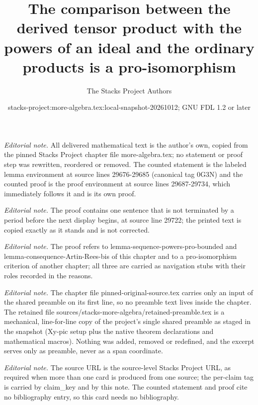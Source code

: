 \documentclass[10pt,a4paper]{amsart}
\title{The comparison between the derived tensor product with the powers of an ideal and the ordinary products is a pro-isomorphism}
\author{The Stacks Project Authors}
\date{stacks-project:more-algebra.tex:local-snapshot-20261012; GNU FDL 1.2 or later}
\theoremstyle{plain}
\theoremstyle{definition}
\theoremstyle{remark}
\numberwithin{equation}{subsection}
\begin{document}
\maketitle
\setcounter{subsection}{1}
\noindent\textit{Editorial note.} All delivered mathematical text is the author's own, copied from the pinned Stacks Project chapter file more-algebra.tex; no statement or proof step was rewritten, reordered or removed. The counted statement is the labeled lemma environment at source lines 29676-29685 (canonical tag 0G3N) and the counted proof is the proof environment at source lines 29687-29734, which immediately follows it and is its own proof.\par\medskip
\noindent\textit{Editorial note.} The proof contains one sentence that is not terminated by a period before the next display begins, at source line 29722; the printed text is copied exactly as it stands and is not corrected.\par\medskip
\noindent\textit{Editorial note.} The proof refers to lemma-sequence-powers-pro-bounded and lemma-consequence-Artin-Rees-bis of this chapter and to a pro-isomorphism criterion of another chapter; all three are carried as navigation stubs with their roles recorded in the reasons.\par\medskip
\noindent\textit{Editorial note.} The chapter file pinned-original-source.tex carries only an input of the shared preamble on its first line, so no preamble text lives inside the chapter. The retained file sources/stacks-more-algebra/retained-preamble.tex is a mechanical, line-for-line copy of the project's single shared preamble as staged in the snapshot (Xy-pic setup plus the native theorem declarations and mathematical macros). Nothing was added, removed or redefined, and the excerpt serves only as preamble, never as a span coordinate.\par\medskip
\noindent\textit{Editorial note.} The source URL is the source-level Stacks Project URL, as required when more than one card is produced from one source; the per-claim tag is carried by claim\_key and by this note. The counted statement and proof cite no bibliography entry, so this card needs no bibliography.\par\medskip
\end{document}
